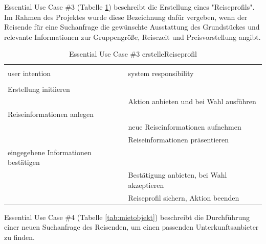 \newpage
Essential Use Case \#3 (Tabelle \ref{tab:reiseprofil}) beschreibt die Erstellung eines "Reiseprofils". Im Rahmen des Projektes wurde diese Bezeichnung dafür vergeben, wenn der Reisende für eine Suchanfrage die gewünschte Ausstattung des Grundstückes und relevante Informationen zur Gruppengröße, Reisezeit und Preisvorstellung angibt.
\begin{table}[H]
\caption{Essential Use Case \#3 erstelleReiseprofil }
\centering
\begin{tabular}{l l}
\\ [-0.5ex]

\hline\hline
\\ [-0.5ex]
user intention & system responsibility
\\ [1.5ex]
\hline
\\ [-0.5ex]
Erstellung initiieren      &                                 \\[1ex]
                     & Aktion anbieten und bei Wahl ausführen   \\[1ex]
Reiseinformationen anlegen    &                                 \\[1ex] 
                     & neue Reiseinformationen aufnehmen        \\[1ex]
                     & Reiseinformationen präsentieren          \\[1ex]
eingegebene Informationen bestätigen   &                                 \\[1ex]
                     & Bestätigung anbieten, bei Wahl akzeptieren \\[1ex]
                     & Reiseprofil sichern, Aktion beenden      \\[1ex]

\hline
\end{tabular}
\label{tab:reiseprofil}
\end{table}


\newpage
Essential Use Case \#4 (Tabelle \ref{tab:mietobjekt}) beschreibt die Durchführung einer neuen Suchanfrage des Reisenden, um einen passenden Unterkunftsanbieter zu finden.

